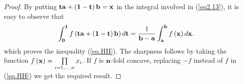 \documentclass{amsart}
\theoremstyle{plain}
\numberwithin{equation}{section}
\begin{document}
\begin{proof}
By putting ${\bf{ta}} + \left( {{\bf{1}} - {\bf{t}}}
\right){\bf{b}} = {\bf{x}}$ in the integral involved in
(\ref{eq2.13}), it is easy to observe that
\begin{align}
\label{eq2.14}\int_{\bf{0}}^{\bf{1}} {f\left( {{\bf{ta}} + \left(
{{\bf{1}} - {\bf{t}}} \right){\bf{b}}} \right)d{\bf{t}}}  =
\frac{1}{{{\bf{b}} - {\bf{a}}}}\int_{\bf{a}}^{\bf{b}} {f\left(
{\bf{x}} \right)d{\bf{x}}}.
\end{align}
which proves the inequality (\ref{eq.HH}). The sharpness follows
by taking the function $f\left({{\bf{x}}}\right)= \prod\limits_{i
= 1, \ldots ,n} {x_i } $. If $f$ is ${\bf{n}}$-fold concave,
replacing $-f$ instead of $f$ in (\ref{eq.HH}) we get the required
result.
\end{proof}
\end{document}
